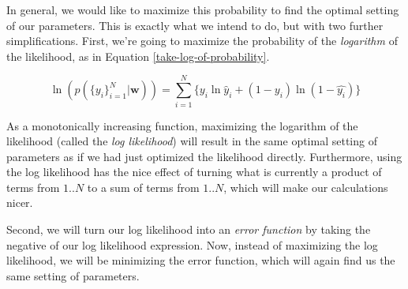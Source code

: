 In general, we would like to maximize this probability to find the optimal setting of our parameters. This is exactly what we intend to do, but with two further simplifications. First, we're going to maximize the probability of the \textit{logarithm} of the likelihood, as in Equation \ref{take-log-of-probability}.

\begin{equation} \label{take-log-of-probability}
    \ln(p(\{y_{i}\}_{i=1}^{N}|\textbf{w})) = \sum_{i=1}^{N} \{y_{i}\ln{\hat{y}_i} + (1 - y_{i})\ln{(1-\hat{y_{i}})}\}
\end{equation}

As a monotonically increasing function, maximizing the logarithm of the likelihood (called the \textit{log likelihood}) will result in the same optimal setting of parameters as if we had just optimized the likelihood directly. Furthermore, using the log likelihood has the nice effect of turning what is currently a product of terms from $1..N$ to a sum of terms from $1..N$, which will make our calculations nicer.

Second, we will turn our log likelihood into an \textit{error function} by taking the negative of our log likelihood expression. Now, instead of maximizing the log likelihood, we will be minimizing the error function, which will again find us the same setting of parameters.


